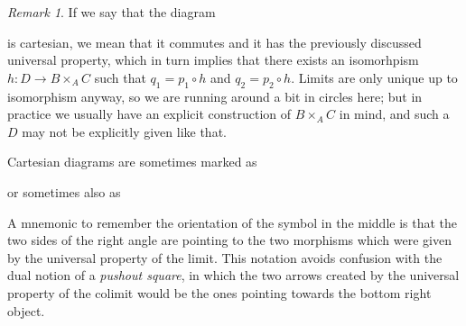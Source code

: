 \documentclass[12pt,reqno,a4paper]{amsart}
\theoremstyle{plain}
\theoremstyle{definition}
\theoremstyle{remark}
\newtheorem{rem}[thm]{Remark}
\begin{document}
\begin{rem}\label{rem:cartesian}
  If we say that the diagram
  \begin{center}
  \end{center}
  is cartesian, we mean that it commutes and it has the previously discussed universal property, which in turn implies that there exists an isomorhpism $h\colon D \to B \times_{A} C$ such that $q_{1} = p_{1} \circ h$ and $q_{2} = p_{2} \circ h$.
  Limits are only unique up to isomorphism anyway, so we are running around a bit in circles here; but in practice we usually have an explicit construction of $B \times_{A} C$ in mind, and such a $D$ may not be explicitly given like that.
\end{rem}

Cartesian diagrams are sometimes marked as
\begin{center}
\end{center}
or sometimes also as
\begin{center}
\end{center}
A mnemonic to remember the orientation of the symbol in the middle is that the two sides of the right angle are pointing to the two morphisms which were given by the universal property of the limit.
This notation avoids confusion with the dual notion of a \textit{pushout square}, in which the two arrows created by the universal property of the colimit would be the ones pointing towards the bottom right object.
\end{document}
